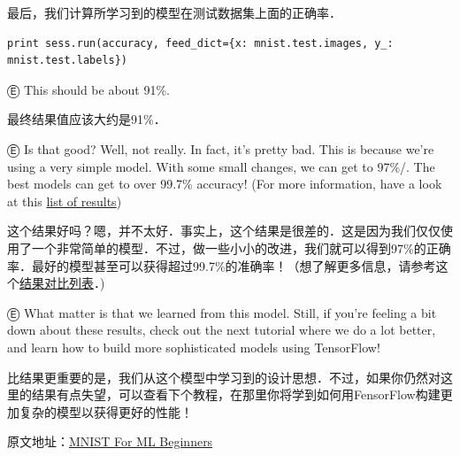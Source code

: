 最后，我们计算所学习到的模型在测试数据集上面的正确率．

\begin{lstlisting}
print sess.run(accuracy, feed_dict={x: mnist.test.images, y_: mnist.test.labels})
\end{lstlisting}

Ⓔ This should be about 91\%.

最终结果值应该大约是91\%．

Ⓔ Is that good? Well, not really. In fact, it's pretty bad. This is because we're using a very simple model. With some small changes, we can get to 97\%/. The best models can get to over 99.7\% accuracy! (For more information, have a look at this \href{http://rodrigob.github.io/are_we_there_yet/build/classification_datasets_results.html}{list of results})

这个结果好吗？嗯，并不太好．事实上，这个结果是很差的．这是因为我们仅仅使用了一个非常简单的模型．不过，做一些小小的改进，我们就可以得到97\%的正确率．最好的模型甚至可以获得超过99.7\%的准确率！（想了解更多信息，请参考这个\href{http://rodrigob.github.io/are_we_there_yet/build/classification_datasets_results.html}{结果对比列表}．)

Ⓔ What matter is that we learned from this model. Still, if you're feeling a bit down about these results, check out the next tutorial where we do a lot better, and learn how to build more sophisticated models using TensorFlow!

比结果更重要的是，我们从这个模型中学习到的设计思想．不过，如果你仍然对这里的结果有点失望，可以查看下个教程，在那里你将学到如何用FensorFlow构建更加复杂的模型以获得更好的性能！

原文地址：\href{http://tensorflow.org/tutorials/mnist/beginners/index.md}{MNIST For ML Beginners}
